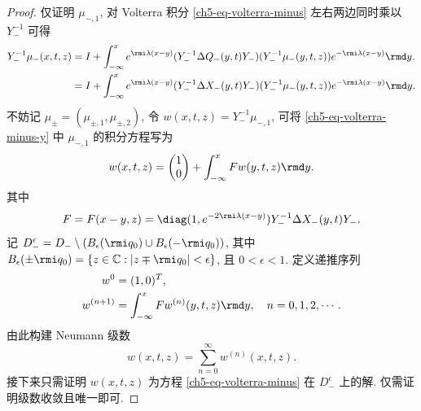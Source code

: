 \begin{proof}
    仅证明 $\mu_{-,1}$, 对 Volterra 积分 \eqref{ch5-eq-volterra-minus} 左右两边同时乘以 $ Y_{-}^{-1} $ 可得
    \begin{equation}
        \begin{aligned}
            Y_{-}^{-1} \mu_{-}(x, t, z) & = I + \int_{-\infty}^{x} e^{\rmi \lambda(x -y)} (Y_{-}^{-1} \Delta Q_{-}(y,t) Y_{-}) (Y_{-}^{-1} \mu_{-}(y,t,z)) e^{-\rmi \lambda(x -y)}\rmd y.  \\
                                        & = I + \int_{-\infty}^{x} e^{\rmi \lambda(x -y)} (Y_{-}^{-1} \Delta X_{-}(y,t) Y_{-}) (Y_{-}^{-1} \mu_{-}(y,t,z)) e^{-\rmi \lambda(x -y)} \rmd y.
            \label{ch5-eq-volterra-minus-y}
        \end{aligned}
    \end{equation}
    不妨记 $ \mu_{\pm} = (\mu_{\pm,1}, \mu_{\pm,2}) $, 令 $ w(x,t,z) = Y_{-}^{-1} \mu_{-,1} $, 可将 \eqref{ch5-eq-volterra-minus-y} 中 $ \mu_{-,1} $ 的积分方程写为
    \begin{equation}
        w(x,t,z) = \begin{pmatrix}
            1 \\
            0
        \end{pmatrix} + \int_{-\infty}^{x} F w(y,t,z) \rmd y.
    \end{equation}
    其中
    \begin{equation}
        F = F(x-y, z) = \diag(1, e^{-2 \rmi \lambda (x-y)}) Y_{-}^{-1} \Delta X_{-}(y,t) Y_{-}.
        \label{ch5-eq-volterra-f}
    \end{equation}
    记 $ D_{-}^{\epsilon} = D_{-} \setminus \left( B_{\epsilon}(\rmi q_{0}) \cup B_{\epsilon}(- \rmi q_{0})\right) $, 其中 $ B_{\epsilon}(\pm \rmi q_{0}) = \{ z \in \mathbb{C} : |z \mp \rmi q_{0}| < \epsilon \} $, 且 $ 0 < \epsilon < 1 $. 定义递推序列
    \begin{align}
        w^{0}     & = (1, 0)^{T},                                                           \\
        w^{(n+1)} & = \int_{-\infty}^{x}F w^{(n)}(y,t,z) \rmd y, \quad n = 0, 1, 2, \cdots.
        \label{ch5-eq-volterra-iter}
    \end{align}
    由此构建 Neumann 级数
    \begin{equation}
        w(x,t,z) = \sum_{n=0}^{\infty} w^{(n)}(x,t,z).
        \label{ch5-eq-volterra-neumann}
    \end{equation}
    接下来只需证明 $ w(x, t, z) $ 为方程 \eqref{ch5-eq-volterra-minus} 在 $D_{-}^{\epsilon} $ 上的解. 仅需证明级数收敛且唯一即可.


\end{proof}
